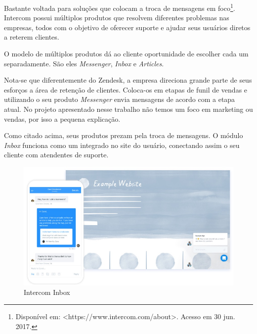Bastante voltada para soluções que colocam a troca de mensagens em foco\footnote{Disponível em: <https://www.intercom.com/about>. Acesso em 30 jun. 2017.}. Intercom possui múltiplos produtos que resolvem diferentes problemas nas empresas, todos com o objetivo de oferecer suporte e ajudar seus usuários diretos a reterem clientes.

O modelo de múltiplos produtos dá ao cliente oportunidade de escolher cada um separadamente. São eles \textit{Messenger}, \textit{Inbox} e \textit{Articles}.



Nota-se que diferentemente do Zendesk, a empresa direciona grande parte de seus esforços a área de retenção de clientes. Coloca-os em etapas de funil de vendas e utilizando o seu produto \textit{Messenger} envia mensagens de acordo com a etapa atual. No projeto apresentado nesse trabalho não temos um foco em marketing ou vendas, por isso a pequena explicação.

Como citado acima, seus produtos prezam pela troca de mensagens. O módulo \textit{Inbox} funciona como um  integrado no site do usuário, conectando assim o seu cliente com atendentes de suporte.

\begin{figure}[ht!]
	\centering
		\includegraphics[scale=0.4]{figures/intercom-inbox.jpg} 
	\caption{Intercom Inbox}
	\label{fig:intercom_inbox}
\end{figure}

